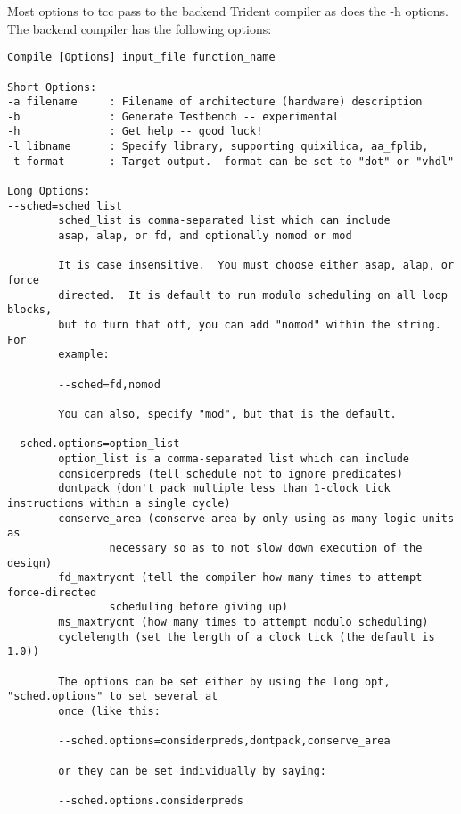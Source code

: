 Most options to tcc pass to the backend Trident compiler as does the -h options.  The
backend compiler has the following options:

\begin{verbatim}
Compile [Options] input_file function_name

Short Options:
-a filename     : Filename of architecture (hardware) description
-b              : Generate Testbench -- experimental
-h              : Get help -- good luck!
-l libname      : Specify library, supporting quixilica, aa_fplib, 
-t format       : Target output.  format can be set to "dot" or "vhdl"

Long Options:
--sched=sched_list
        sched_list is comma-separated list which can include
        asap, alap, or fd, and optionally nomod or mod

        It is case insensitive.  You must choose either asap, alap, or force
        directed.  It is default to run modulo scheduling on all loop blocks,
        but to turn that off, you can add "nomod" within the string.  For
        example:

        --sched=fd,nomod

        You can also, specify "mod", but that is the default.

--sched.options=option_list
        option_list is a comma-separated list which can include
        considerpreds (tell schedule not to ignore predicates)
        dontpack (don't pack multiple less than 1-clock tick instructions within a single cycle)
        conserve_area (conserve area by only using as many logic units as 
                necessary so as to not slow down execution of the design)
        fd_maxtrycnt (tell the compiler how many times to attempt force-directed 
                scheduling before giving up)
        ms_maxtrycnt (how many times to attempt modulo scheduling)
        cyclelength (set the length of a clock tick (the default is 1.0))

        The options can be set either by using the long opt, "sched.options" to set several at
        once (like this:

        --sched.options=considerpreds,dontpack,conserve_area

        or they can be set individually by saying:

        --sched.options.considerpreds
\end{verbatim}

